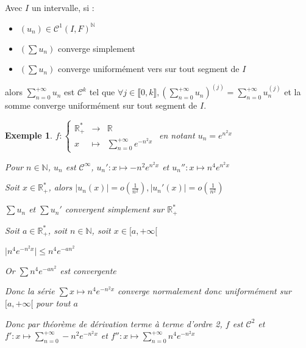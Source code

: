\documentclass[a4paper,12pt]{book}
\newcommand{\Thr}[2]{\begin{tcolorbox}[sharp corners, colback=white,colframe=red!90!black!75, title=Théorème : #1]#2\end{tcolorbox}}
\newtheorem{Exe}{Exemple}[section]
\def\R{\mathbb{R}}
\def\N{\mathbb{N}}
\begin{document}
\Thr{Théorème de dérivation terme à terme à l'ordre k}{Avec $I$ un intervalle, si :\begin{itemize}\item $(u_n)\in\mathcal{C}^1(I,F)^\N$ \item $(\sum u_n)$ converge simplement \item $(\sum u_n)$ converge uniformément vers sur tout segment de $I$\end{itemize} alors $\sum\limits_{n=0}^{+\infty}u_n$ est $\mathcal{C}^k$ tel que $\forall j\in\llbracket0,k\rrbracket, \left(\sum\limits_{n=0}^{+\infty}u_n\right)^{(j)}=\sum\limits_{n=0}^{+\infty}u_n^{(j)}$ et la somme converge uniformément sur tout segment de $I$.}
\begin{Exe}
$f:\left\{\begin{array}{rcl}\R_+^* & \to & \R \\ x & \mapsto & \sum\limits_{n=0}^{+\infty}e^{-n^2x}\end{array}\right.$ en notant $u_n=e^{n^2x}$ \par Pour $n\in\N$, $u_n$ est $\mathcal{C}^\infty$, $u_n':x\mapsto -n^2e^{n^2x}$ et $u_n'':x\mapsto n^4e^{n^2x}$ \par Soit $x\in\R_+^*$, alors $\vert u_n(x)\vert=o(\frac{1}{n^2}), \vert u_n'(x)\vert=o(\frac{1}{n^2})$ \par $\sum u_n$ et $\sum u_n'$ convergent simplement sur $\R_+^*$ \par Soit $a\in\R_+^*$, soit $n\in\N$, soit $x\in[a,+\infty[$ \par $\vert n^4e^{-n^2x}\vert\leq n^4e^{-an^2}$ \par Or $\sum n^4e^{-an^2}$ est convergente
\par Donc la série $\sum x\mapsto n^4e^{-n^2x}$ converge normalement donc uniformément sur $[a,+\infty[$ pour tout $a$ \par Donc par théorème de dérivation terme à terme d'ordre 2, $f$ est $\mathcal{C}^2$ et $f':x\mapsto \sum\limits_{n=0}^{+\infty}-n^2e^{-n^2x}$ et $f'':x\mapsto \sum\limits_{n=0}^{+\infty}n^4e^{-n^2x}$
\end{Exe}
\end{document}
